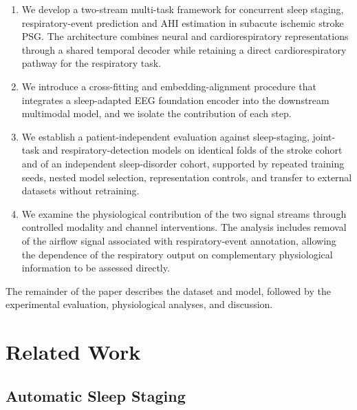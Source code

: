 \documentclass{ieeeaccess}
\begin{document}
\begin{enumerate}

\item \label{c:model}
We develop a two-stream multi-task framework for concurrent sleep staging,
respiratory-event prediction and AHI estimation in subacute ischemic stroke PSG.
The architecture combines neural and cardiorespiratory representations through a
shared temporal decoder while retaining a direct cardiorespiratory pathway for
the respiratory task.

\item \label{c:encoder}
We introduce a cross-fitting and embedding-alignment procedure that integrates a
sleep-adapted EEG foundation encoder into the downstream multimodal model, and we
isolate the contribution of each step.

\item \label{c:bench}\label{c:ceiling}
We establish a patient-independent evaluation against sleep-staging,
joint-task and respiratory-detection models on identical folds of the stroke
cohort and of an independent sleep-disorder cohort, supported by repeated
training seeds, nested model selection, representation controls, and transfer to
external datasets without retraining.

\item \label{c:resp}\label{c:attrib}
We examine the physiological contribution of the two signal streams through
controlled modality and channel interventions. The analysis includes removal of
the airflow signal associated with respiratory-event annotation, allowing the
dependence of the respiratory output on complementary physiological information
to be assessed directly.

\end{enumerate}

The remainder of the paper describes the dataset and model, followed by the experimental evaluation, physiological analyses, and discussion.

\section{Related Work}
\label{sec:related}

\subsection{Automatic Sleep Staging}
\end{document}

